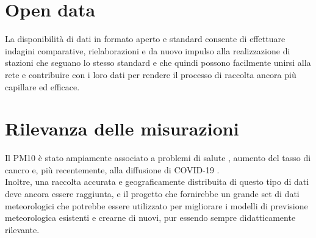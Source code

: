\documentclass[12pt, a4paper]{article}
\begin{document}
	\section{Open data}
	La disponibilità di dati in formato aperto e standard consente di effettuare indagini comparative, rielaborazioni e da nuovo impulso alla realizzazione di stazioni che seguano lo stesso standard e che quindi possono facilmente unirsi alla rete e contribuire con i loro dati per rendere il processo di raccolta ancora più capillare ed efficace.
	
	\section{Rilevanza delle misurazioni}
	Il PM10 è stato ampiamente associato a problemi di salute \cite{pm101996}, aumento del tasso di cancro \cite{pm10} e, più recentemente, alla diffusione di COVID-19 \cite{pmcovid}.\\
	Inoltre, una raccolta accurata e geograficamente distribuita di questo tipo di dati deve ancora essere raggiunta, e il progetto che fornirebbe un grande set di dati meteorologici che potrebbe essere utilizzato per migliorare i modelli di previsione meteorologica esistenti e crearne di nuovi, pur essendo sempre didatticamente rilevante.\\
\end{document}
